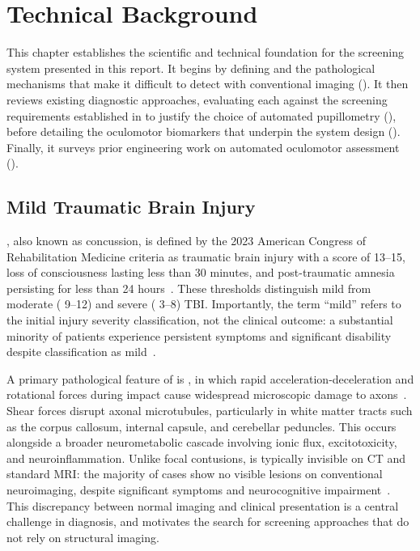 \chapter{Technical Background}
\label{chapter:background}

This chapter establishes the scientific and technical foundation for the screening system presented in this report. It begins by defining  and the pathological mechanisms that make it difficult to detect with conventional imaging (). It then reviews existing diagnostic approaches, evaluating each against the screening requirements established in  to justify the choice of automated pupillometry (), before detailing the oculomotor biomarkers that underpin the system design (). Finally, it surveys prior engineering work on automated oculomotor assessment ().

\section{Mild Traumatic Brain Injury}
\label{sec:bg-mtbi}

, also known as concussion, is defined by the 2023 American Congress of Rehabilitation Medicine criteria as traumatic brain injury with a  score of 13--15, loss of consciousness lasting less than 30 minutes, and post-traumatic amnesia persisting for less than 24 hours~\cite{silverberg2023acrm}. These thresholds distinguish mild from moderate ( 9--12) and severe ( 3--8) TBI. Importantly, the term ``mild'' refers to the initial injury severity classification, not the clinical outcome: a substantial minority of patients experience persistent symptoms and significant disability despite classification as mild~\cite{silverberg2023acrm}.

A primary pathological feature of  is , in which rapid acceleration-deceleration and rotational forces during impact cause widespread microscopic damage to axons~\cite{johnson2013axonal}. Shear forces disrupt axonal microtubules, particularly in white matter tracts such as the corpus callosum, internal capsule, and cerebellar peduncles. This occurs alongside a broader neurometabolic cascade involving ionic flux, excitotoxicity, and neuroinflammation. Unlike focal contusions,  is typically invisible on CT and standard MRI: the majority of  cases show no visible lesions on conventional neuroimaging, despite significant symptoms and neurocognitive impairment~\cite{lee2005neuroimaging, palacios2022dti}. This discrepancy between normal imaging and clinical presentation is a central challenge in  diagnosis, and motivates the search for screening approaches that do not rely on structural imaging.


